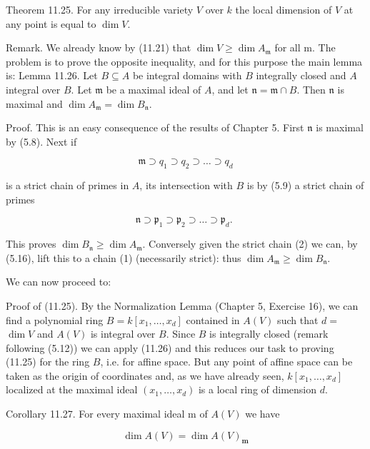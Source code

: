 \documentclass{standalone}
\theoremstyle{definition}
\theoremstyle{remark}
\begin{document}
Theorem 11.25. For any irreducible variety $V$ over $k$ the local dimension of $V$ at any point is equal to $\operatorname{dim} V$.

Remark. We already know by (11.21) that $\operatorname{dim} V \geqslant \operatorname{dim} A_{\mathfrak{m}}$ for all $\mathrm{m}$. The problem is to prove the opposite inequality, and for this purpose the main lemma is: Lemma 11.26. Let $B \subseteq A$ be integral domains with $B$ integrally closed and $A$ integral over $B$. Let $\mathfrak{m}$ be a maximal ideal of $A$, and let $\mathfrak{n}=\mathfrak{m} \cap B$. Then $\mathfrak{n}$ is maximal and $\operatorname{dim} A_{\mathfrak{m}}=\operatorname{dim} B_{\mathfrak{n}}$.

Proof. This is an easy consequence of the results of Chapter 5. First $\mathfrak{n}$ is maximal by (5.8). Next if

\[
\mathfrak{m} \supset q_{1} \supset q_{2} \supset \ldots \supset q_{d}
\]

is a strict chain of primes in $A$, its intersection with $B$ is by (5.9) a strict chain of primes

\[
\mathfrak{n} \supset \mathfrak{p}_{1} \supset \mathfrak{p}_{2} \supset \ldots \supset \mathfrak{p}_{d} \text {. }
\]

This proves $\operatorname{dim} B_{\mathfrak{n}} \geqslant \operatorname{dim} A_{\mathfrak{m}}$. Conversely given the strict chain (2) we can, by (5.16), lift this to a chain (1) (necessarily strict): thus $\operatorname{dim} A_{\mathfrak{m}} \geqslant \operatorname{dim} B_{\mathfrak{n}}$.

We can now proceed to:

Proof of (11.25). By the Normalization Lemma (Chapter 5, Exercise 16), we can find a polynomial ring $B=k\left[x_{1}, \ldots, x_{d}\right]$ contained in $A(V)$ such that $d=$ $\operatorname{dim} V$ and $A(V)$ is integral over $B$. Since $B$ is integrally closed (remark following (5.12)) we can apply (11.26) and this reduces our task to proving (11.25) for the ring $B$, i.e. for affine space. But any point of affine space can be taken as the origin of coordinates and, as we have already seen, $k\left[x_{1}, \ldots, x_{d}\right]$ localized at the maximal ideal $\left(x_{1}, \ldots, x_{d}\right)$ is a local ring of dimension $d$.

Corollary 11.27. For every maximal ideal $\mathrm{m}$ of $A(V)$ we have

\[
\operatorname{dim} A(V)=\operatorname{dim} A(V)_{\mathbf{m}}
\]
\end{document}
